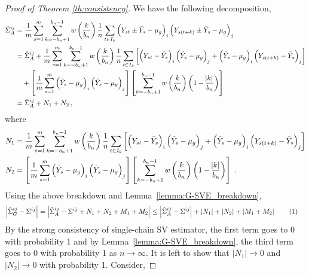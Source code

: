 \documentclass[12pt]{article}
\newcommand\numberthis{\addtocounter{equation}{1}\tag{\theequation}}
\theoremstyle{remark}
\begin{document}
\begin{proof}[Proof of Theorem \ref{th:consistency}]
We have the following decomposition,
\begin{align*}
\tilde{\Sigma}_{A}^{ij}
    & = \dfrac{1}{m}\sum_{s=1}^{m}\sum_{k=-b_n+1}^{b_n-1}w\left(\dfrac{k}{b_n}\right)\dfrac{1}{n}\sum_{t \in I_k}  \left(Y_{st} \pm \bar{Y}_s - \mu_g \right)_i  \left(Y_{s(t + k)} \pm \bar{Y}_s - \mu_g \right)_j\\
    & = \hat{\Sigma}_{A}^{ij} + \dfrac{1}{m}\sum_{s=1}^{m}\sum_{k=-b_n+1}^{b_n-1}w\left(\dfrac{k}{b_n}\right)\dfrac{1}{n}\sum_{t \in I_k}\left[ \left(Y_{st} - \bar{Y}_s \right)_i   \left(\bar{Y}_s - \mu_g \right)_j + \left(\bar{Y}_s - \mu_g \right)_i  \left(Y_{s(t+k)} - \bar{Y}_s \right)_j\right]\\
    & \quad + \left[\dfrac{1}{m}  \sum_{s=1}^{m}  \left(\bar{Y}_s - \mu_g \right)_i  \left(\bar{Y}_s - \mu_g \right)_j \right]  \left[\sum_{k=-b_n+1}^{b_n-1}w\left(\dfrac{k}{b_n}\right)\left(1 - \dfrac{\abs{k}}{b_n}\right) \right]\\
    & = \hat{\Sigma}_{A}^{ij} + N_1 + N_2 \,,
\end{align*}
where
\begin{align*}
N_1 & = \dfrac{1}{m}\sum_{s=1}^{m}  \sum_{k=-b_n+1}^{b_n-1}  w\left(\dfrac{k}{b_n}\right)\dfrac{1}{n}  \sum_{t \in I_k}  \left[ \left(Y_{st} - \bar{Y}_s \right)_i  \left(\bar{Y}_s - \mu_g \right)_j + \left(\bar{Y}_s - \mu_g \right)_i  \left(Y_{s(t+k)} - \bar{Y}_s \right)_j\right]\\
N_2 & = \left[\dfrac{1}{m}  \sum_{s=1}^{m}  \left(\bar{Y}_s - \mu_g \right)_i  \left(\bar{Y}_s - \mu_g \right)_j \right]  \left[\sum_{k=-b_n+1}^{b_n-1}w\left(\dfrac{k}{b_n}\right)\left(1 - \dfrac{\abs{k}}{b_n}\right) \right]\;.
\end{align*}
%
Using the above breakdown and  Lemma~\ref{lemma:G-SVE_breakdown}, 
\begin{align*}
\left|\hat{\Sigma}_{G}^{ij} - \Sigma^{ij} \right| & = \left| \hat{\Sigma}_{A}^{ij} - \Sigma^{ij} + N_1 + N_2 + M_1 + M_2 \right|  \leq \left| \hat{\Sigma}_{A}^{ij} - \Sigma^{ij} \right| +  \left| N_1 \right| +  \left|N_2 \right| + \left| M_1 + M_2 \right| \numberthis \label{eq:G-SVE_full_decomp}
\end{align*}
%
By the strong consistency of single-chain SV estimator, the first term goes to 0 with probability 1 and by Lemma~\ref{lemma:G-SVE_breakdown}, the third term goes to 0 with probability 1 as $n \to \infty$. It is left to show that $|N_1| \to 0$ and $|N_2| \to 0$ with probability 1. Consider,

\end{proof}
\end{document}
